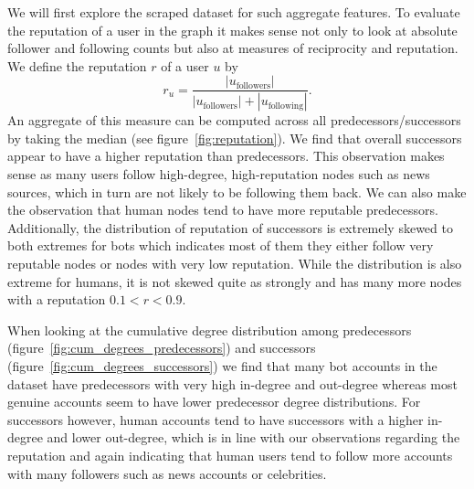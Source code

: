 We will first explore the scraped dataset for such aggregate features. To evaluate the reputation of a user in the graph it makes sense not only to look at absolute follower and following counts but also at measures of reciprocity and reputation. We define the reputation $r$ of a user $u$ by
$$r_u = \frac{ |u_\text{followers}| }{ |u_\text{followers}| + |u_\text{following}|}.$$
An aggregate of this measure can be computed across all predecessors/successors by taking the median (see figure~\ref{fig:reputation}). We find that overall successors appear to have a higher reputation than predecessors. This observation makes sense as many users follow high-degree, high-reputation nodes such as news sources, which in turn are not likely to be following them back. We can also make the observation that human nodes tend to have more reputable predecessors. Additionally, the distribution of reputation of successors is extremely skewed to both extremes for bots which indicates most of them they either follow very reputable nodes or nodes with very low reputation. While the distribution is also extreme for humans, it is not skewed quite as strongly and has many more nodes with a reputation $0.1 < r < 0.9$.

When looking at the cumulative degree distribution among predecessors (figure~\ref{fig:cum_degrees_predecessors}) and successors (figure~\ref{fig:cum_degrees_successors}) we find that many bot accounts in the dataset have predecessors with very high in-degree and out-degree whereas most genuine accounts seem to have lower predecessor degree distributions. For successors however, human accounts tend to have successors with a higher in-degree and lower out-degree, which is in line with our observations regarding the reputation and again indicating that human users tend to follow more accounts with many followers such as news accounts or celebrities. 


